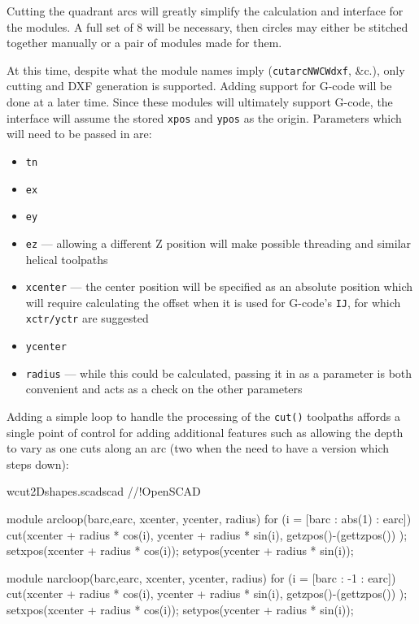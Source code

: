 \documentclass{ltxdoc}
\begin{document}
Cutting the quadrant arcs will greatly simplify the calculation and interface for the modules.
A full set of 8 will be necessary, then circles may either be stitched together manually or
a pair of modules made for them.
 
At this time, despite what the module names imply (\texttt{cutarcNWCWdxf}, \&c.), only cutting  
and DXF generation is supported. Adding support for G-code will be done at a later time.
Since these modules will ultimately support G-code, the interface will assume the stored
\texttt{xpos} and \texttt{ypos} as the origin. Parameters which will need to be passed in are:
 
\begin{itemize}
 \item \texttt{tn}
 \item \texttt{ex}
 \item \texttt{ey}
 \item \texttt{ez} --- allowing a different Z position will make possible threading and
                       similar helical toolpaths
\item \texttt{xcenter} --- the center position will be specified as an absolute position
      which will require calculating the offset when it is used for G-code's \texttt{IJ},
      for which \texttt{xctr/yctr} are suggested 
\item \texttt{ycenter}
\item \texttt{radius} --- while this could be calculated, passing it in as a parameter
      is both convenient and acts as a check on the other parameters
\end{itemize}

Adding a simple loop to handle the processing of the \texttt{cut()} toolpaths affords 
a single point of control for adding additional features such as allowing the depth to 
vary as one cuts along an arc (two when the need to have a version which steps down):

\lstset{firstnumber=1}
\begin{writecode}{w}{cut2Dshapes.scad}{scad}
//!OpenSCAD

module arcloop(barc,earc, xcenter, ycenter, radius) {
  for (i = [barc : abs(1) : earc]) {
        cut(xcenter + radius * cos(i),
        ycenter + radius * sin(i),
        getzpos()-(gettzpos())
        );
    setxpos(xcenter + radius * cos(i));
    setypos(ycenter + radius * sin(i));
  }
}

module narcloop(barc,earc, xcenter, ycenter, radius) {
  for (i = [barc : -1 : earc]) {
        cut(xcenter + radius * cos(i),
        ycenter + radius * sin(i),
        getzpos()-(gettzpos())
        );
    setxpos(xcenter + radius * cos(i));
    setypos(ycenter + radius * sin(i));
  }
}

\end{writecode}
\addtocounter{cuttwod}{25}
 
\end{document}
